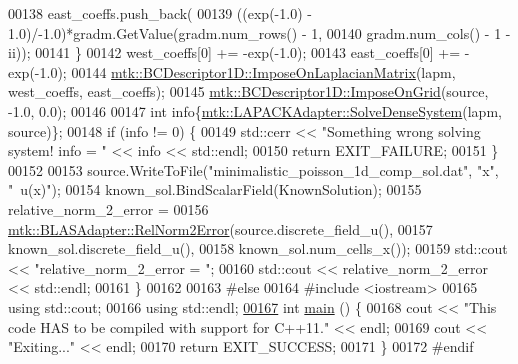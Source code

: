 \begin{DoxyCode}
00138     east\_coeffs.push\_back(
00139       ((exp(-1.0) - 1.0)/-1.0)*gradm.GetValue(gradm.num\_rows() - 1,
00140                                               gradm.num\_cols() - 1 - ii));
00141   \}
00142   west\_coeffs[0] += -exp(-1.0);
00143   east\_coeffs[0] += -exp(-1.0);
00144   \hyperlink{classmtk_1_1BCDescriptor1D_a33e51235eaa930e4470f027001a023cf}{mtk::BCDescriptor1D::ImposeOnLaplacianMatrix}(lapm, 
      west\_coeffs, east\_coeffs);
00145   \hyperlink{classmtk_1_1BCDescriptor1D_adfb101c1a12b452f83dacd207febea0a}{mtk::BCDescriptor1D::ImposeOnGrid}(source, -1.0, 0.0);
00146 
00147   \textcolor{keywordtype}{int} info\{\hyperlink{classmtk_1_1LAPACKAdapter_a7428bccf74fd4a4af68fb7233846da22}{mtk::LAPACKAdapter::SolveDenseSystem}(lapm, source)\};
00148   \textcolor{keywordflow}{if} (info != 0) \{
00149     std::cerr << \textcolor{stringliteral}{"Something wrong solving system! info = "} << info << std::endl;
00150     \textcolor{keywordflow}{return} EXIT\_FAILURE;
00151   \}
00152 
00153   source.WriteToFile(\textcolor{stringliteral}{"minimalistic\_poisson\_1d\_comp\_sol.dat"}, \textcolor{stringliteral}{"x"}, \textcolor{stringliteral}{"~u(x)"});
00154   known\_sol.BindScalarField(KnownSolution);
00155   relative\_norm\_2\_error =
00156     \hyperlink{classmtk_1_1BLASAdapter_af2ac5691f45e67d6e26186b071119ec4}{mtk::BLASAdapter::RelNorm2Error}(source.discrete\_field\_u(),
00157                                     known\_sol.discrete\_field\_u(),
00158                                     known\_sol.num\_cells\_x());
00159   std::cout << \textcolor{stringliteral}{"relative\_norm\_2\_error = "};
00160   std::cout << relative\_norm\_2\_error << std::endl;
00161 \}
00162 
00163 \textcolor{preprocessor}{#else}
00164 \textcolor{preprocessor}{#include <iostream>}
00165 \textcolor{keyword}{using} std::cout;
00166 \textcolor{keyword}{using} std::endl;
\hypertarget{minimalistic__poisson__1d_8cc_source_l00167}{}\hyperlink{minimalistic__poisson__1d_8cc_ae66f6b31b5ad750f1fe042a706a4e3d4}{00167} \textcolor{keywordtype}{int} \hyperlink{minimalistic__poisson__1d_8cc_ae66f6b31b5ad750f1fe042a706a4e3d4}{main} () \{
00168   cout << \textcolor{stringliteral}{"This code HAS to be compiled with support for C++11."} << endl;
00169   cout << \textcolor{stringliteral}{"Exiting..."} << endl;
00170   \textcolor{keywordflow}{return} EXIT\_SUCCESS;
00171 \}
00172 \textcolor{preprocessor}{#endif}
\end{DoxyCode}
